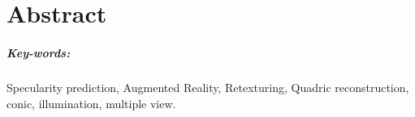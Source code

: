 \chapter*{Abstract}


\paragraph{Key-words:} Specularity prediction, Augmented Reality, Retexturing, Quadric reconstruction, conic, illumination, multiple view.

